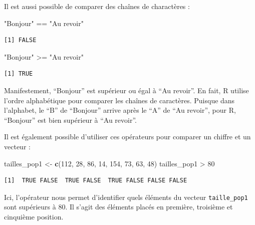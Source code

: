 \documentclass[a4paperpaper,]{article}
\newenvironment{Shaded}{\begin{snugshade}}{\end{snugshade}}
\newcommand{\DecValTok}[1]{\textcolor[rgb]{0.69,0.50,0.00}{#1}}
\newcommand{\KeywordTok}[1]{\textcolor[rgb]{0.12,0.11,0.11}{\textbf{#1}}}
\newcommand{\NormalTok}[1]{\textcolor[rgb]{0.12,0.11,0.11}{#1}}
\newcommand{\OperatorTok}[1]{\textcolor[rgb]{0.12,0.11,0.11}{#1}}
\newcommand{\StringTok}[1]{\textcolor[rgb]{0.75,0.01,0.01}{#1}}
\theoremstyle{definition}
\theoremstyle{definition}
\theoremstyle{definition}
\theoremstyle{remark}
\begin{document}
Il est aussi possible de comparer des chaînes de charactères :

\begin{Shaded}
\begin{Highlighting}[]
\StringTok{"Bonjour"} \OperatorTok{==}\StringTok{ "Au revoir"}
\end{Highlighting}
\end{Shaded}

\begin{verbatim}
[1] FALSE
\end{verbatim}

\begin{Shaded}
\begin{Highlighting}[]
\StringTok{"Bonjour"} \OperatorTok{>=}\StringTok{ "Au revoir"}
\end{Highlighting}
\end{Shaded}

\begin{verbatim}
[1] TRUE
\end{verbatim}

Manifestement, ``Bonjour'' est supérieur ou égal à ``Au revoir''. En
fait, R utilise l'ordre alphabétique pour comparer les chaînes de
caractères. Puisque dans l'alphabet, le ``B'' de ``Bonjour'' arrive
après le ``A'' de ``Au revoir'', pour R, ``Bonjour'' est bien supérieur
à ``Au revoir''.

Il est également possible d'utiliser ces opérateurs pour comparer un
chiffre et un vecteur :

\begin{Shaded}
\begin{Highlighting}[]
\NormalTok{tailles_pop1 <-}\StringTok{ }\KeywordTok{c}\NormalTok{(}\DecValTok{112}\NormalTok{, }\DecValTok{28}\NormalTok{, }\DecValTok{86}\NormalTok{, }\DecValTok{14}\NormalTok{, }\DecValTok{154}\NormalTok{, }\DecValTok{73}\NormalTok{, }\DecValTok{63}\NormalTok{, }\DecValTok{48}\NormalTok{)}
\NormalTok{tailles_pop1 }\OperatorTok{>}\StringTok{ }\DecValTok{80}
\end{Highlighting}
\end{Shaded}

\begin{verbatim}
[1]  TRUE FALSE  TRUE FALSE  TRUE FALSE FALSE FALSE
\end{verbatim}

Ici, l'opérateur nous permet d'identifier quels éléments du vecteur
\texttt{taille\_pop1} sont supérieurs à 80. Il s'agit des éléments
placés en première, troisième et cinquième position.
\end{document}
